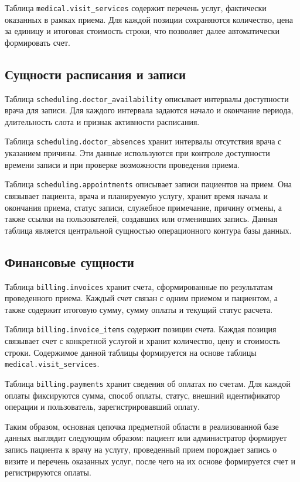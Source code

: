 Таблица \texttt{medical.visit\_services} содержит перечень услуг, фактически оказанных в рамках приема. Для каждой позиции сохраняются количество, цена за единицу и итоговая стоимость строки, что позволяет далее автоматически формировать счет.

\subsection{Сущности расписания и записи}

Таблица \texttt{scheduling.doctor\_availability} описывает интервалы доступности врача для записи. Для каждого интервала задаются начало и окончание периода, длительность слота и признак активности расписания.

Таблица \texttt{scheduling.doctor\_absences} хранит интервалы отсутствия врача с указанием причины. Эти данные используются при контроле доступности времени записи и при проверке возможности проведения приема.

Таблица \texttt{scheduling.appointments} описывает записи пациентов на прием. Она связывает пациента, врача и планируемую услугу, хранит время начала и окончания приема, статус записи, служебное примечание, причину отмены, а также ссылки на пользователей, создавших или отменивших запись. Данная таблица является центральной сущностью операционного контура базы данных.

\subsection{Финансовые сущности}

Таблица \texttt{billing.invoices} хранит счета, сформированные по результатам проведенного приема. Каждый счет связан с одним приемом и пациентом, а также содержит итоговую сумму, сумму оплаты и текущий статус расчета.

Таблица \texttt{billing.invoice\_items} содержит позиции счета. Каждая позиция связывает счет с конкретной услугой и хранит количество, цену и стоимость строки. Содержимое данной таблицы формируется на основе таблицы \texttt{medical.visit\_services}.

Таблица \texttt{billing.payments} хранит сведения об оплатах по счетам. Для каждой оплаты фиксируются сумма, способ оплаты, статус, внешний идентификатор операции и пользователь, зарегистрировавший оплату.

Таким образом, основная цепочка предметной области в реализованной базе данных выглядит следующим образом: пациент или администратор формирует запись пациента к врачу на услугу, проведенный прием порождает запись о визите и перечень оказанных услуг, после чего на их основе формируется счет и регистрируются оплаты.

